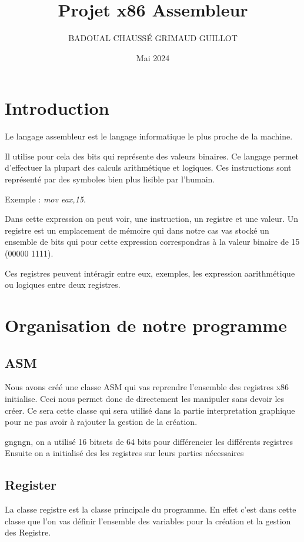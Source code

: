 \documentclass{article}
\title{Projet x86 Assembleur}
\author{BADOUAL CHAUSSÉ GRIMAUD GUILLOT}
\date{Mai 2024}
\begin{document}
\maketitle

\section{Introduction}
Le langage assembleur est le langage informatique le plus proche de la machine.

Il utilise pour cela des bits qui représente des valeurs binaires. Ce langage permet d'effectuer la plupart des calculs arithmétique et logiques. Ces instructions sont représenté par des symboles bien plus lisible par l'humain.

Exemple : \emph{mov eax,15}.

Dans cette expression on peut voir, une instruction, un registre et une valeur. Un registre est un emplacement de mémoire qui dans notre cas vas stocké un ensemble de bits qui pour cette expression correspondras à la valeur binaire de 15 (00000 1111).

Ces registres peuvent intéragir entre eux, exemples, les expression aarithmétique ou logiques entre deux registres.

\section{Organisation de notre programme}
\subsection{ASM}
Nous avons créé une classe ASM qui vas reprendre l'ensemble des registres x86 initialise. Ceci nous permet donc de directement les manipuler sans devoir les créer. Ce sera cette classe qui sera utilisé dans la partie interpretation graphique pour ne pas avoir à rajouter la gestion de la création.

gngngn, on a utilisé 16 bitsets de 64 bits pour différencier les différents registres
Ensuite on a initialisé des les registres sur leurs parties nécessaires

\subsection{Register}
La classe registre est la classe principale du programme. En effet c'est dans cette classe que l'on vas définir l'ensemble des variables pour la création et la gestion des Registre.
\end{document}
